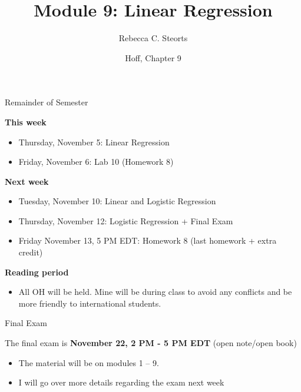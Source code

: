 \documentclass[
  ignorenonframetext,
]{beamer}
\title{Module 9: Linear Regression}
\author{Rebecca C. Steorts}
\date{Hoff, Chapter 9}
\providecommand{\tightlist}{%
  \setlength{\itemsep}{0pt}\setlength{\parskip}{0pt}}
\begin{document}
\frame{\titlepage}

\begin{frame}{Remainder of Semester}
\protect\hypertarget{remainder-of-semester}{}

\textbf{This week}

\begin{itemize}
\tightlist
\item
  Thursday, November 5: Linear Regression
\item
  Friday, November 6: Lab 10 (Homework 8)
\end{itemize}

\vspace*{1em}

\textbf{Next week}

\begin{itemize}
\tightlist
\item
  Tuesday, November 10: Linear and Logistic Regression
\item
  Thursday, November 12: Logistic Regression + Final Exam
\item
  Friday November 13, 5 PM EDT: Homework 8 (last homework + extra
  credit)
\end{itemize}

\vspace*{1em}

\textbf{Reading period}

\begin{itemize}
\tightlist
\item
  All OH will be held. Mine will be during class to avoid any conflicts
  and be more friendly to international students.
\end{itemize}

\end{frame}

\begin{frame}{Final Exam}
\protect\hypertarget{final-exam}{}

The final exam is \textbf{November 22, 2 PM - 5 PM EDT} (open note/open
book)

\begin{itemize}
\tightlist
\item
  The material will be on modules 1 -- 9.
\item
  I will go over more details regarding the exam next week
\end{itemize}

\end{frame}
\end{document}
